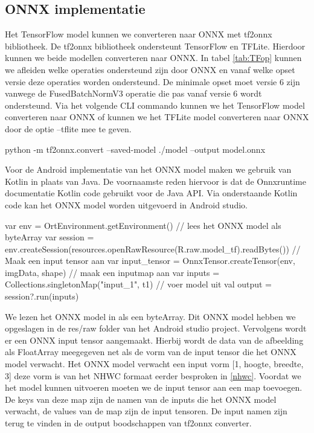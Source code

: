 \subsection{ONNX implementatie} \label{classonnx}
Het TensorFlow model kunnen we converteren naar ONNX met tf2onnx bibliotheek.
De tf2onnx bibliotheek ondersteunt TensorFlow en TFLite.
Hierdoor kunnen we beide modellen converteren naar ONNX.
In tabel \ref{tab:TFop} kunnen we afleiden welke operaties ondersteund zijn door ONNX en vanaf welke opset versie deze operaties worden ondersteund.
De minimale opset moet versie 6 zijn vanwege de FusedBatchNormV3 operatie die pas vanaf versie 6 wordt ondersteund.
Via het volgende CLI commando kunnen we het TensorFlow model converteren naar ONNX of kunnen we het TFLite model converteren naar ONNX door de optie --tflite mee te geven.

\begin{python}
python -m tf2onnx.convert --saved-model ./model --output model.onnx
\end{python}

Voor de Android implementatie van het ONNX model maken we gebruik van Kotlin in plaats van Java.
De voornaamste reden hiervoor is dat de Onnxruntime documentatie Kotlin code gebruikt voor de Java API.
Via onderstaande Kotlin code kan het ONNX model worden uitgevoerd in Android studio.

\begin{python} 
var env = OrtEnvironment.getEnvironment()
// lees het ONNX model als byteArray
var session = env.createSession(resources.openRawResource(R.raw.model_tf).readBytes())
// Maak een input tensor aan
var input_tensor = OnnxTensor.createTensor(env, imgData, shape)
// maak een inputmap aan
var inputs = Collections.singletonMap("input_1", t1)
// voer model uit
val output = session?.run(inputs)
\end{python}

We lezen het ONNX model in als een byteArray.
Dit ONNX model hebben we opgeslagen in de res/raw folder van het Android studio project.
Vervolgens wordt er een ONNX input tensor aangemaakt.
Hierbij wordt de data van de afbeelding als FloatArray meegegeven net als de vorm van de input tensor die het ONNX model verwacht.
Het ONNX model verwacht een input vorm [1, hoogte, breedte, 3] deze vorm is van het NHWC formaat eerder besproken in \ref{nhwc}.
Voordat we het model kunnen uitvoeren moeten we de input tensor aan een map toevoegen.
De keys van deze map zijn de namen van de inputs die het ONNX model verwacht, de values van de map zijn de input tensoren.
De input namen zijn terug te vinden in de output boodschappen van tf2onnx converter.

